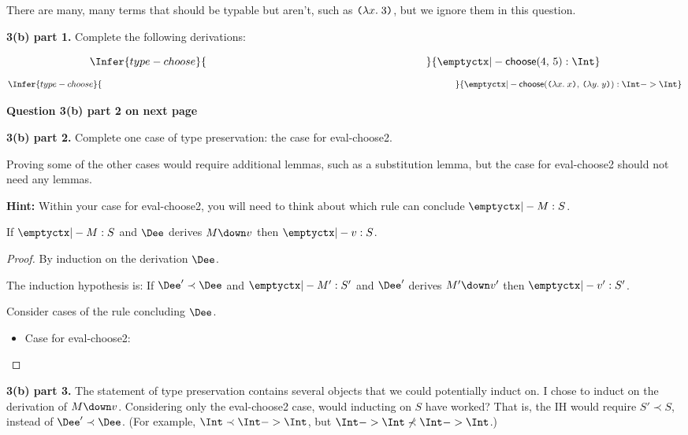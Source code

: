 There are many, many terms that should be typable but aren't,
such as $\texttt(\lambda{x}.\;{3}\texttt)$, but we ignore them in this question.



\textbf{3(b) part 1.} 
Complete the following derivations:

\vspace{5ex}
\[
\Infer{type-choose}
     {
       \hspace*{200pt}
     }
     {
       \emptyctx |- \DC{4}{5} : \Int
     }
\]
\vspace{12ex}
\[
\Infer{type-choose}
     {
       \hspace*{400pt}
     }
     {
       \emptyctx |-        \DC{\lcabs{x}{x}}{\lcabs{y}{y}} : \Int -> \Int
     }
\]

\vfill

\textbf{Question 3(b) part 2 on next page}
\clearpage

\textbf{3(b) part 2.}
Complete one case of type preservation: the case for eval-choose2.

Proving some of the other cases would require additional lemmas, such as a substitution lemma,
but the case for eval-choose2 should not need any lemmas.


\textbf{Hint:} Within your case for eval-choose2,
you will need to think about which rule can conclude $\emptyctx |- M : S$.

\begin{conjecture}
  If $\emptyctx |- M : S$
  and $\Dee$ derives $M \down v$
  then
  $\emptyctx |- v : S$.
\end{conjecture}
\begin{proof}
  By induction on the derivation $\Dee$.

  The induction hypothesis is:
  If $\Dee' \prec \Dee$ and $\emptyctx |- M' : S'$
  and $\Dee'$ derives $M' \down v'$
  then $\emptyctx |- v' : S'$.

  Consider cases of the rule concluding $\Dee$.

  \begin{itemize}
  \item Case for eval-choose2:

\vfill
  \end{itemize}
\end{proof}


\textbf{3(b) part 3.}
The statement of type preservation contains several objects that we could potentially induct on.
I chose to induct on the derivation of $M \down v$.
Considering only the eval-choose2 case, would inducting on $S$
have worked?  That is, the IH would require $S' \prec S$, instead of $\Dee' \prec \Dee$.
(For example, $\Int \prec \Int -> \Int$, but $\Int -> \Int \not\prec \Int -> \Int$.)

\vspace*{15ex}







